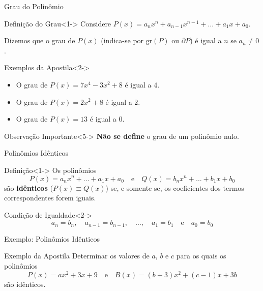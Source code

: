 \documentclass[10pt, aspectratio=169]{beamer}
\begin{document}
\begin{frame}{Grau do Polinômio}
  \begin{block}{Definição do Grau}<1->
    Considere $P(x) = a_n x^n + a_{n-1} x^{n-1} + \dots + a_1 x + a_0$.
    
    Dizemos que o grau de $P(x)$ (indica-se por $\text{gr}(P)$ ou $\partial P$) é igual a $n$ se $a_n \neq 0$.
  \end{block}

  \pause

  \begin{exampleblock}{Exemplos da Apostila}<2->
    \begin{itemize}[<+->]
      \item O grau de $P(x) = 7x^4 - 3x^2 + 8$ é igual a $4$.
      \item O grau de $P(x) = 2x^2 + 8$ é igual a $2$.
      \item O grau de $P(x) = 13$ é igual a $0$.
    \end{itemize}
  \end{exampleblock}

  \pause

  \begin{alertblock}{Observação Importante}<5->
    \textbf{Não se define} o grau de um polinômio nulo.
  \end{alertblock}
\end{frame}

\begin{frame}{Polinômios Idênticos}
  \begin{block}{Definição}<1->
    Os polinômios 
    \[ P(x) = a_n x^n + \dots + a_1 x + a_0 \quad \text{e} \quad Q(x) = b_n x^n + \dots + b_1 x + b_0 \]
    são \textbf{idênticos} ($P(x) \equiv Q(x)$) se, e somente se, os coeficientes dos termos correspondentes forem iguais.
  \end{block}

  \pause

  \begin{block}{Condição de Igualdade}<2->
    \[
      a_n = b_n, \quad a_{n-1} = b_{n-1}, \quad \dots, \quad a_1 = b_1 \quad \text{e} \quad a_0 = b_0
    \]
  \end{block}
\end{frame}

\begin{frame}{Exemplo: Polinômios Idênticos}
  \begin{exampleblock}{Exemplo da Apostila}
    Determinar os valores de $a$, $b$ e $c$ para os quais os polinômios
    \[
      P(x) = ax^2 + 3x + 9 \quad \text{e} \quad B(x) = (b+3)x^2 + (c-1)x + 3b
    \]
    são idênticos.
  \end{exampleblock}

\end{frame}
\end{document}
